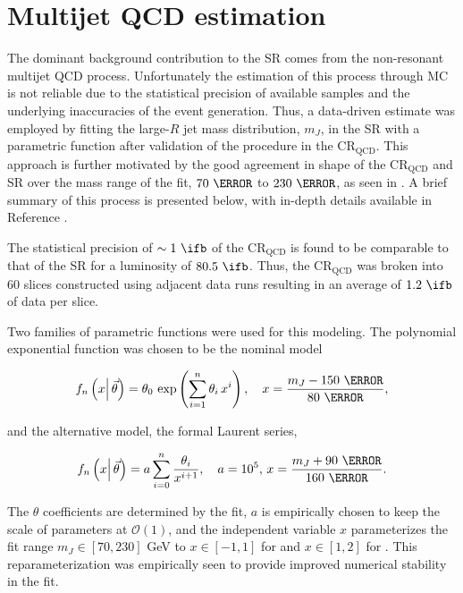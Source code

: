 \section{Multijet QCD estimation} \label{sec:background:qcd}

The dominant background contribution to the SR comes from the non-resonant
multijet QCD process. Unfortunately the estimation of this process through MC
is not reliable due to the statistical precision of available samples and the
underlying inaccuracies of the event generation.  Thus, a data-driven estimate
was employed by fitting the large-$R$ jet mass distribution, $m_{J}$, in the SR
with a parametric function after validation of the procedure in the
$\text{CR}_{\text{QCD}}$.  This approach is further motivated by the good
agreement in shape of the $\text{CR}_{\text{QCD}}$ and SR over the mass range
of the fit, $70~\GeV$ to $230~\GeV$, as seen in
. A brief summary of this process is presented
below, with in-depth details available in Reference \cite{Feickert:2690521}.

The statistical precision of $\sim 1~\ifb$ of the
$\text{CR}_{\text{QCD}}$ is found to be comparable to that of the SR for a
luminosity of $80.5~\ifb$.  Thus, the $\text{CR}_{\text{QCD}}$ was
broken into 60 slices constructed using adjacent data runs resulting in an
average of $1.2~\ifb$ of data per slice.

Two families of parametric functions were used for this modeling.  The
polynomial exponential function was chosen to be the nominal model

\begin{equation}
\label{sec:background:polynomial}
f_{n} \left(x \middle|\,\vec{\theta}\right) = \theta_{0}\, \exp\left(\sum_{i=1}^{n} \theta_{i}\,x^{i}\right), \quad x = \frac{m_{J} - 150~\GeV}{80~\GeV},
\end{equation}

and the alternative model, the formal Laurent series,

\begin{equation}
\label{sec:background:laurent}
f_{n} \left(x \middle|\,\vec{\theta}\right) = a \sum_{i=0}^{n} \frac{\theta_{i}}{x^{i+1}}, \quad a=10^{5},\,x = \frac{m_{J} + 90~\GeV}{160~\GeV}.
\end{equation}

The $\theta$ coefficients are determined by the fit, $a$ is empirically chosen
to keep the scale of parameters at $\mathcal{O}(1)$, and the independent
variable $x$ parameterizes the fit range $m_{J}\in[70,230]$ GeV to $x\in[-1,1]$
for  and $x\in[1,2]$ for
.  This reparameterization was empirically seen to
provide improved numerical stability in the fit.

